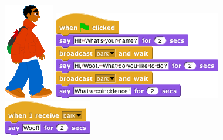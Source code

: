 \documentclass{report}
\begin{document}
\begin{figure}[H]
\begin{minipage}{0.5\textwidth}
\centering
\includegraphics[scale=0.4]{../common/boy1-walking}
\end{minipage}%
\begin{minipage}{0.5\textwidth}
\centering
{}
\end{minipage}

\vspace{3ex}
\begin{minipage}[t]{0.5\textwidth}
\centering
\vspace{0pt} %
\includegraphics[scale=\defaultGraphicsScale]{inter-sprite-communication-1}
\end{minipage}%
\begin{minipage}[t]{0.5\textwidth}
\centering
\vspace{0pt} %
\includegraphics[scale=\defaultGraphicsScale]{inter-sprite-communication-2}
\end{minipage}
\end{figure}
\end{document}
